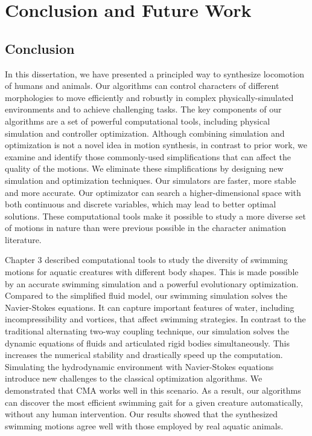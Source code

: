 \chapter{Conclusion and Future Work}

\section{Conclusion}
In this dissertation, we have presented a principled way to synthesize locomotion of humans and animals. Our algorithms can control characters of different morphologies to move efficiently and robustly in complex physically-simulated environments and to achieve challenging tasks. The key components of our algorithms are a set of powerful computational tools, including physical simulation and controller optimization. Although combining simulation and optimization is not a novel idea in motion synthesis, in contrast to prior work, we examine and identify those commonly-used simplifications that can affect the quality of the motions. We eliminate these simplifications by designing new simulation and optimization techniques. Our simulators are faster, more stable and more accurate. Our optimizator can search a higher-dimensional space with both continuous and discrete variables, which may lead to better optimal solutions. These computational tools make it possible to study a more diverse set of motions in nature than were previous possible in the character animation literature.

Chapter 3 described computational tools to study the diversity of swimming motions for aquatic creatures with different body shapes. This is made possible by an accurate swimming simulation and a powerful evolutionary optimization. Compared to the simplified fluid model, our swimming simulation solves the Navier-Stokes equations. It can capture important features of water, including incompressibility and vortices, that affect swimming strategies. In contrast to the traditional alternating two-way coupling technique, our simulation solves the dynamic equations of fluids and articulated rigid bodies simultaneously. This increases the numerical stability and drastically speed up the computation. Simulating the hydrodynamic environment with Navier-Stokes equations introduce new challenges to the classical optimization algorithms. We demonstrated that CMA works well in this scenario. As a result, our algorithms can discover the most efficient swimming gait for a given creature automatically, without any human intervention. Our results showed that the synthesized swimming motions agree well with those employed by real aquatic animals.

